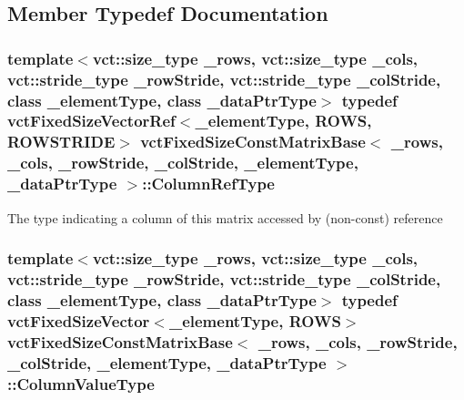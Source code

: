 \subsection{Member Typedef Documentation}
\hypertarget{classvct_fixed_size_const_matrix_base_a9cbbc3a040a90709bdeac3b94c766131}{
\subsubsection[{Column\-Ref\-Type}]{\setlength{\rightskip}{0pt plus 5cm}template$<$vct\-::size\-\_\-type \-\_\-rows, vct\-::size\-\_\-type \-\_\-cols, vct\-::stride\-\_\-type \-\_\-row\-Stride, vct\-::stride\-\_\-type \-\_\-col\-Stride, class \-\_\-element\-Type, class \-\_\-data\-Ptr\-Type$>$ typedef {\bf vct\-Fixed\-Size\-Vector\-Ref}$<$\-\_\-element\-Type, {\bf R\-O\-W\-S}, {\bf R\-O\-W\-S\-T\-R\-I\-D\-E}$>$ {\bf vct\-Fixed\-Size\-Const\-Matrix\-Base}$<$ \-\_\-rows, \-\_\-cols, \-\_\-row\-Stride, \-\_\-col\-Stride, \-\_\-element\-Type, \-\_\-data\-Ptr\-Type $>$\-::{\bf Column\-Ref\-Type}}}\label{classvct_fixed_size_const_matrix_base_a9cbbc3a040a90709bdeac3b94c766131}
The type indicating a column of this matrix accessed by (non-\/const) reference \hypertarget{classvct_fixed_size_const_matrix_base_a1c4e4fda1ae603282d28745d3ec78493}{
\subsubsection[{Column\-Value\-Type}]{\setlength{\rightskip}{0pt plus 5cm}template$<$vct\-::size\-\_\-type \-\_\-rows, vct\-::size\-\_\-type \-\_\-cols, vct\-::stride\-\_\-type \-\_\-row\-Stride, vct\-::stride\-\_\-type \-\_\-col\-Stride, class \-\_\-element\-Type, class \-\_\-data\-Ptr\-Type$>$ typedef {\bf vct\-Fixed\-Size\-Vector}$<$\-\_\-element\-Type, {\bf R\-O\-W\-S}$>$ {\bf vct\-Fixed\-Size\-Const\-Matrix\-Base}$<$ \-\_\-rows, \-\_\-cols, \-\_\-row\-Stride, \-\_\-col\-Stride, \-\_\-element\-Type, \-\_\-data\-Ptr\-Type $>$\-::{\bf Column\-Value\-Type}}}\label{classvct_fixed_size_const_matrix_base_a1c4e4fda1ae603282d28745d3ec78493}
